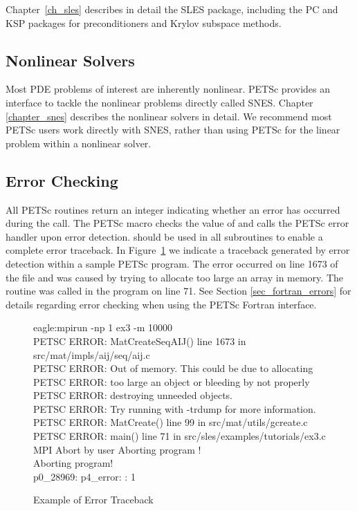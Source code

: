 Chapter~\ref{ch_sles} describes in detail the SLES package, including
the PC and KSP packages for preconditioners and Krylov subspace methods.

\subsection*{Nonlinear Solvers}
Most PDE problems of interest are inherently nonlinear. PETSc provides 
an interface to tackle the nonlinear problems directly called SNES. Chapter
\ref{chapter_snes} describes the nonlinear solvers in detail. We recommend 
most PETSc users work directly with SNES, rather than using PETSc
for the linear problem within a nonlinear solver.

\subsection*{Error Checking}

All PETSc routines return an integer indicating whether an error
has occurred during the call.  The PETSc macro 
checks the value of  and calls the PETSc error handler
upon error detection.   should be used in all
subroutines to enable a complete error traceback.
In Figure~\ref{fig_traceback} we indicate a
traceback generated by error detection within a sample PETSc
program. The error occurred on line 1673 of the file  and was caused by trying to allocate too
large an array in memory. The routine was called in the program 
 on line 71.  See Section \ref{sec_fortran_errors} for
details regarding error checking when using the PETSc Fortran interface.

\begin{figure}[H]
\begin{tabbing}
   eagle:mpirun -np 1 ex3 -m 10000\\
   PETSC ERROR: MatCreateSeqAIJ() line 1673 in src/mat/impls/aij/seq/aij.c\\
   PETSC ERROR:   Out of memory. This could be due to allocating\\
   PETSC ERROR:   too large an object or bleeding by not properly\\
   PETSC ERROR:   destroying unneeded objects.\\
   PETSC ERROR:   Try running with -trdump for more information.\\ 
   PETSC ERROR: MatCreate() line 99 in src/mat/utils/gcreate.c  \\
   PETSC ERROR: main() line 71 in src/sles/examples/tutorials/ex3.c\\  
   MPI Abort by user Aborting program !\\
   Aborting program! \\
   p0\_28969:  p4\_error: : 1
\end{tabbing}
\nobreak
\caption{Example of Error Traceback}
\label{fig_traceback}
\end{figure}

